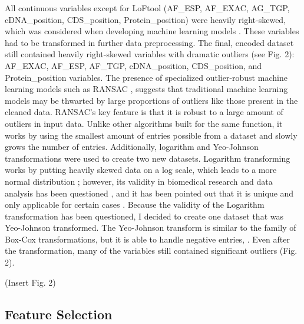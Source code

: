 \documentclass[journal,two side,web]{ieeecolor}
\begin{document}
All continuous variables except for LoFtool (AF\_ESP, AF\_EXAC, AG\_TGP, cDNA\_position, CDS\_position, Protein\_position) were heavily right-skewed, which was considered when developing machine learning models \cite{raymaekers2021transforming}. These variables had to be transformed in further data preprocessing.  The final, encoded dataset still contained heavily right-skewed variables with dramatic outliers (see Fig. 2): AF\_EXAC, AF\_ESP, AF\_TGP, cDNA\_position, CDS\_position, and Protein\_position variables. The presence of specialized outlier-robust machine learning models such as RANSAC \cite{zuliani2009ransac}, \cite{derpanis2010overview} suggests that traditional machine learning models may be thwarted by large proportions of outliers like those present in the cleaned data. RANSAC's key feature is that it is robust to a large amount of outliers in input data. Unlike other algorithms built for the same function, it works by using the smallest amount of entries possible from a dataset and slowly grows the number of entries. Additionally, logarithm and Yeo-Johnson transformations were used to create two new datasets. Logarithm transforming works by putting heavily skewed data on a log scale, which leads to a more normal distribution \cite{curran2018explorations}; however, its validity in biomedical research and data analysis has been questioned \cite{changyong2014log}, \cite{feng2013log} and it has been pointed out that it is unique and only applicable for certain cases \cite{keene1995log}. Because the validity of the Logarithm transformation has been questioned, I decided to create one dataset that was Yeo-Johnson transformed. The Yeo-Johnson transform is similar to the family of Box-Cox transformations, but it is able to handle negative entries\cite{weisberg2001yeo}, \cite{yeo2000new}. Even after the transformation, many of the variables still contained significant outliers (Fig. 2).

(Insert Fig. 2) 

\subsection{Feature Selection}
\end{document}
